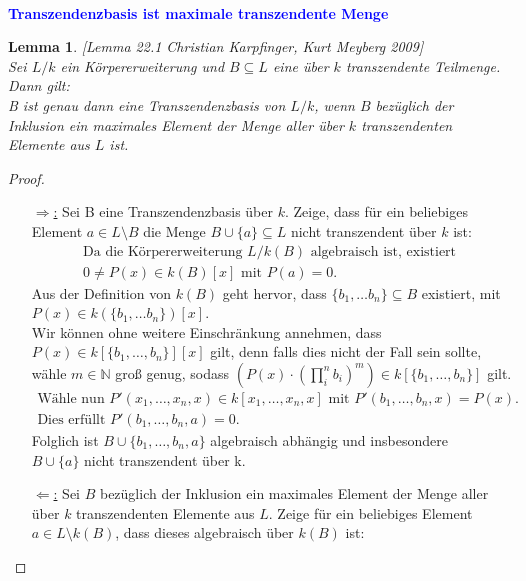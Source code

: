 \documentclass[10pt,a4paper]{report}
\newcommand{\Algebra}{Christian Karpfinger, Kurt Meyberg 2009}
\newcounter{Aussage}[chapter]
\newtheorem{lemma}[Aussage]{Lemma}
\begin{document}
\ \\
\textcolor{blue}{\textbf{Transzendenzbasis ist maximale transzendente Menge}}
\begin{lemma}\label{Transzendenzbasis ist maximale transzendente Menge}\textit{[Lemma 22.1 \Algebra]}\\
Sei $L / k$ ein Körpererweiterung und $B \subseteq L$ eine über $k$ transzendente Teilmenge. Dann gilt:\\
B ist genau dann eine Transzendenzbasis von $L/k$, wenn $B$ bezüglich der Inklusion ein maximales Element der Menge aller über $k$ transzendenten Elemente aus $L$ ist.
\end{lemma}
\begin{proof} \ \\
\begin{itemize}
\item[\underline{\glqq $\Rightarrow$:\grqq}] Sei B eine Transzendenzbasis über $k$. Zeige, dass für ein beliebiges Element $a \in L \setminus B$ die Menge $B \cup \lbrace a \rbrace \subseteq L$ nicht transzendent über $k$ ist:
\begin{gather*}
\text{Da die Körpererweiterung $L / k(B)$ algebraisch ist, existiert }\\ 0 \neq P(x) \in k(B)[x] \text{ mit } P(a) = 0.
\end{gather*}
Aus der Definition von $k(B)$ geht hervor, dass $\lbrace b_1, \dots b_n \rbrace \subseteq B$ existiert, mit $P(x) \in k(\lbrace b_1, \dots b_n \rbrace)[x]$.\\ 
Wir können ohne weitere Einschränkung annehmen, dass $P(x) \in k[\lbrace b_1, \dots ,b_n \rbrace][x]$ gilt, denn falls dies nicht der Fall sein sollte, wähle $m \in \mathbb{N}$ groß genug, sodass $\left( P(x) \cdot \left( \prod_i^n b_i \right)^m \right) \in k[\lbrace b_1, \dots ,b_n \rbrace]$ gilt.
\begin{gather*}
\text{Wähle nun } P'(x_1, \dots , x_n , x) \in  k[x_1, \dots , x_n , x] \text{ mit } P'(b_1, \dots , b_n, x) = P(x).\\
\text{Dies erfüllt } P'(b_1, \dots , b_n, a) = 0.
\end{gather*}
Folglich ist $B \cup \lbrace b_1,\dots,b_n, a \rbrace$ algebraisch abhängig und insbesondere \\
$B \cup \lbrace a \rbrace$ nicht transzendent über k.
\item[\underline{\glqq $\Leftarrow$:\grqq}] Sei $B$ bezüglich der Inklusion ein maximales Element der Menge aller über $k$ transzendenten Elemente aus $L$. Zeige für ein beliebiges Element $a \in L \setminus k(B)$, dass dieses algebraisch über $k(B)$ ist:\\

\end{itemize}
\end{proof}
\end{document}
